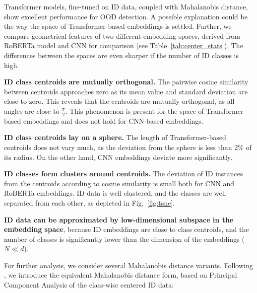 \documentclass[letterpaper, final]{article} %
\begin{document}
Transformer models, fine-tuned on ID data, coupled with Mahalanobis distance, show excellent performance for OOD detection. A possible explanation could be the way the space of Transformer-based embeddings is settled. Further, we compare geometrical features of two different embedding spaces, derived from RoBERTa model and CNN for comparison (see Table~\ref{tab:center_stats}). The differences between the spaces are even sharper if the number of ID classes is high. 


{\bf ID class centroids are mutually orthogonal.}  The pairwise cosine similarity between centroids approaches zero as its mean value and standard deviation are close to zero. This reveals that the centroids are mutually orthogonal, as all angles are close to $\frac{\pi}2$. This phenomenon is present for the space of Transformer-based embeddings and does not hold for CNN-based embeddings.

{\bf ID class centroids lay on a sphere.} The length of Transformer-based centroids  does not vary much, as the deviation from the sphere is less than 2\% of its radius. On the other hand, CNN embeddings deviate more significantly.

{\bf ID classes form clusters around centroids.} The deviation of ID instances from the centroids according to cosine similarity is small both for CNN and RoBERTa embeddings. ID data is well clustered, and the classes are well separated from each other, as depicted in Fig.~\ref{fig:tsne}.


{\bf ID data can be approximated by low-dimensional subspace in the embedding space}, because ID embeddings are close to class centroids, and the number of classes is significantly lower than the dimension of the embeddings ($N \ll d$). 

For further analysis, we consider several Mahalanobis distance variants. Following \citet*{Kamoi2020WhyIT}, we introduce the equivalent Mahalanobis distance form, based on  Principal Component Analysis of the class-wise centered ID data:

\end{document}
